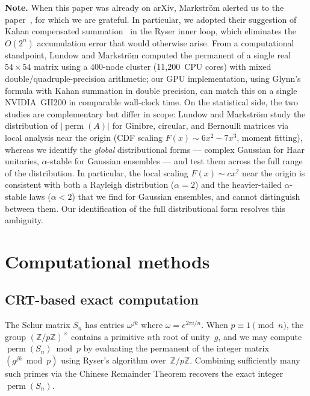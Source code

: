 \documentclass[11pt]{amsart}
\theoremstyle{definition}
\theoremstyle{remark}
\DeclareMathOperator{\perm}{perm}
\begin{document}
\medskip\noindent\textbf{Note.}
When this paper was already on arXiv, Markstr\"om alerted us to the
paper~\cite{LundowMarkstrom19}, for which we are grateful.
In particular, we adopted their suggestion of Kahan compensated
summation~\cite{Kahan65} in the Ryser inner loop, which eliminates the
$O(2^n)$ accumulation error that would otherwise arise.
From a computational standpoint, Lundow and Markstr\"om computed the
permanent of a single real $54\times 54$ matrix using a 400-node
cluster (11{,}200~CPU cores) with mixed double/quadruple-precision
arithmetic; our GPU implementation, using Glynn's formula with Kahan
summation in double precision, can match this on a single NVIDIA~GH200
in comparable wall-clock time.
On the statistical side, the two studies are complementary but differ
in scope: Lundow and Markstr\"om study the distribution of
$|\perm(A)|$ for Ginibre, circular, and Bernoulli matrices via local
analysis near the origin (CDF scaling $F(x)\sim 6x^2-7x^3$, moment
fitting), whereas we identify the \emph{global} distributional forms
--- complex Gaussian for Haar unitaries, $\alpha$-stable for Gaussian
ensembles --- and test them across the full range of the distribution.
In particular, the local scaling $F(x)\sim cx^2$ near the origin is
consistent with both a Rayleigh distribution ($\alpha=2$) and the
heavier-tailed $\alpha$-stable laws ($\alpha<2$) that we find for
Gaussian ensembles, and cannot distinguish between them.  Our
identification of the full distributional form resolves this ambiguity.

\section{Computational methods}\label{sec:computation}

\subsection{CRT-based exact computation}

The Schur matrix $S_n$ has entries $\omega^{jk}$ where
$\omega=e^{2\pi i/n}$.  When $p\equiv 1\pmod{n}$, the group
$(\mathbb{Z}/p\mathbb{Z})^\times$ contains a primitive $n$th root of
unity~$g$, and we may compute $\perm(S_n)\bmod p$ by evaluating the
permanent of the integer matrix $(g^{jk}\bmod p)$ using Ryser's
algorithm over~$\mathbb{Z}/p\mathbb{Z}$.  Combining sufficiently many
such primes via the Chinese Remainder Theorem recovers the exact
integer $\perm(S_n)$.
\end{document}
